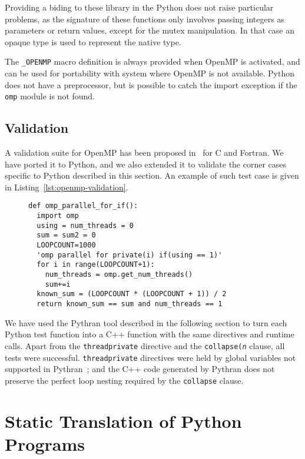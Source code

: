 \documentclass{llncs}
\begin{document}
Providing a biding to these library in the Python does not raise
particular problems, as the signature of these functions only involves passing
integers as parameters or return values, except for the mutex manipulation. In
that case an opaque type is used to represent the native type.

The \texttt{\_OPENMP} macro definition is always provided when OpenMP is
activated, and can be used for portability with system where OpenMP is not
available. Python does not have a preprocessor, but is possible to catch the
import exception if the \texttt{omp} module is not found.

\subsection{Validation}

A validation suite for OpenMP has been proposed in~\cite{wang2012} for C and
Fortran. We have ported it to Python, and we also extended it to validate the
corner cases specific to Python described in this section. An example of such
test case is given in Listing~\ref{lst:openmp-validation}.

\begin{figure}
    \begin{lstlisting}[label={lst:openmp-validation},caption={Example of Python
    OpenMP validation test case.}]
def omp_parallel_for_if():
  import omp
  using = num_threads = 0
  sum = sum2 = 0
  LOOPCOUNT=1000
  'omp parallel for private(i) if(using == 1)'
  for i in range(LOOPCOUNT+1):
    num_threads = omp.get_num_threads()
    sum+=i
  known_sum = (LOOPCOUNT * (LOOPCOUNT + 1)) / 2
  return known_sum == sum and num_threads == 1
    \end{lstlisting}
\end{figure}

We have used the Pythran tool described in the following section to turn each
Python test function into a C++ function with the same directives and runtime
calls. Apart from the \texttt{threadprivate} directive and the
\texttt{collapse(\emph{n}} clause, all tests were successful.
\texttt{threadprivate} directives were held by global variables not supported in
Pythran~; and the C++ code generated by Pythran does not preserve the perfect
loop nesting required by the \texttt{collapse} clause.

\section{Static Translation of Python Programs}\label{sec:python-static}
\end{document}
